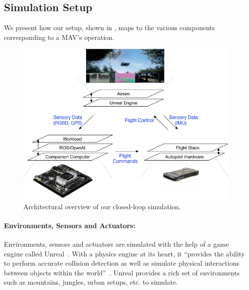 {


\subsection{Simulation Setup}
\label{sec:setup}

We present how our setup, shown in , maps to the various components corresponding to a MAV's operation.

\begin{figure}[t!]
\centering
\includegraphics[trim= 10 10 10 10, clip, width=0.75\columnwidth]{figs/replace-end-to-end-simulation.png}
\caption{Architectural overview of our closed-loop simulation. 
}
\label{fig:end-to-end}
\end{figure}

\paragraph{Environments, Sensors and Actuators:} Environments, sensors and actuators are simulated with the help of a game engine called Unreal~\cite{GameEngi70:online}. With a physics engine at its heart, it ``provides the ability to perform accurate collision detection as well as simulate physical interactions between objects within the world''~\cite{PhysicsS8:online}. Unreal provides a rich set of environments such as mountains, jungles, urban setups, etc. to simulate.

}

